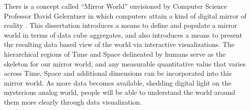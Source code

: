 There is a concept called ``Mirror World'' envisioned by Computer Science Professor David Gelerntner in which computers attain a kind of digital mirror of reality \cite{gelernter1991mirror}. This dissertation introduces a means to define and populate a mirror world in terms of data cube aggregates, and also introduces a means to present the resulting data based view of the world via interactive visualizations. The hierarchical regions of Time and Space delineated by humans serve as the skeleton for our mirror world, and any measurable quantitative value that varies across Time, Space and additional dimensions can be incorporated into this mirror world. As more data becomes available, shedding digital light on the mysterious analog world, people will be able to understand the world around them more clearly through data visualization.
